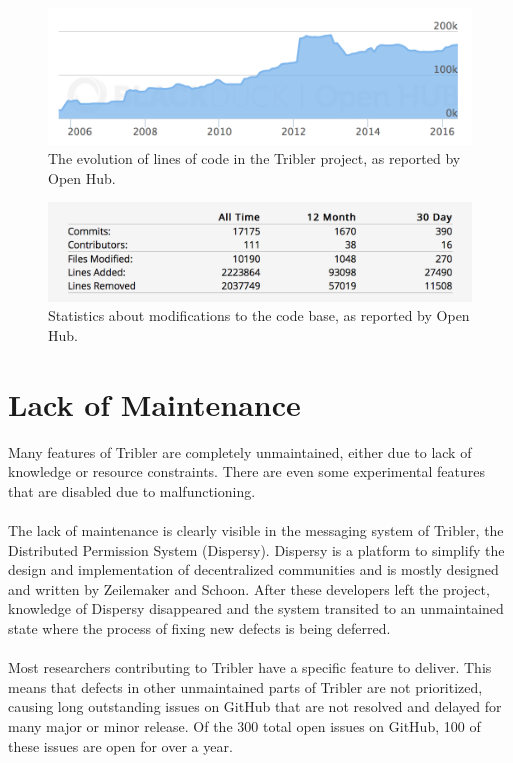 \begin{figure}[!h]
	\centering
	\includegraphics[width=\columnwidth]{images/openhub_loc}
	\caption{The evolution of lines of code in the Tribler project, as reported by Open Hub.}
	\label{fig:openhub-loc}
\end{figure}

\begin{figure}[!h]
	\centering
	\includegraphics[width=0.7\columnwidth]{images/openhub_commits_table}
	\caption{Statistics about modifications to the code base, as reported by Open Hub.}
	\label{fig:openhub-commit-stats}
\end{figure}

\section{Lack of Maintenance}
Many features of Tribler are completely unmaintained, either due to lack of knowledge or resource constraints. There are even some experimental features that are disabled due to malfunctioning.\\\\
The lack of maintenance is clearly visible in the messaging system of Tribler, the Distributed Permission System (Dispersy). Dispersy is a platform to simplify the design and implementation of decentralized communities and is mostly designed and written by Zeilemaker and Schoon\cite{zeilemaker2013dispersy}. After these developers left the project, knowledge of Dispersy disappeared and the system transited to an unmaintained state where the process of fixing new defects is being deferred.\\\\
Most researchers contributing to Tribler have a specific feature to deliver. This means that defects in other unmaintained parts of Tribler are not prioritized, causing long outstanding issues on GitHub that are not resolved and delayed for many major or minor release. Of the 300 total open issues on GitHub, 100 of these issues are open for over a year.
 

